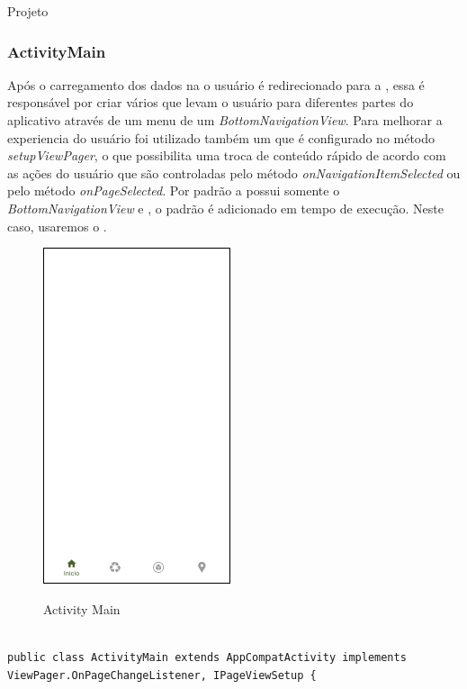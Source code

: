\documentclass[
	12pt,				%
	openright,			%
	twoside,			%
	a4paper,			%
	english,			%
	french,				%
	spanish,			%
	brazil				%
	]{abntex2}
\begin{document}
\begin{chapter}{Projeto}
\subsubsection{ActivityMain} \label{main_activity}
Após o carregamento dos dados na  o usuário é redirecionado para a , essa  é responsável por criar vários  que levam o usuário para diferentes partes do aplicativo através de um menu de um \textit{BottomNavigationView}. Para melhorar a experiencia do usuário foi utilizado também um  que é configurado no método \textit{setupViewPager}, o que possibilita uma troca de conteúdo rápido de acordo com as ações do usuário que são controladas pelo método \textit{onNavigationItemSelected} ou pelo método \textit{onPageSelected}. Por padrão a  possui somente o \textit{BottomNavigationView} e , o  padrão é adicionado em tempo de execução. Neste caso, usaremos o .

\newpage

\begin{figure}[h]
\centering
   \caption{Activity Main}
   \includegraphics[scale=1.0]{media/activity_main.png}
     \label{fig:activity_main_app}
\end{figure}


\begin{lstlisting}[numbers=none,
basicstyle=\small,
caption={MainActivity.java},
title={MainActivity.java},
label={MainActivity.java}]

public class ActivityMain extends AppCompatActivity implements ViewPager.OnPageChangeListener, IPageViewSetup {



\end{lstlisting}
\end{chapter}
\end{document}
